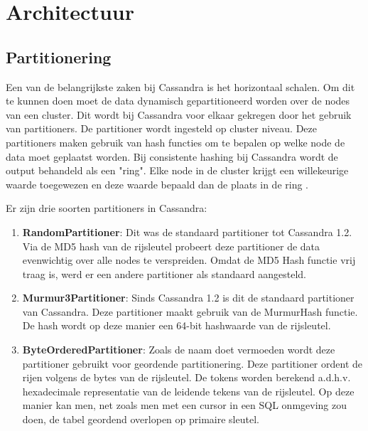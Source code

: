 \chapter{Architectuur}
\label{ch:cassandra_architectuur}

\section{Partitionering}
Een van de belangrijkste zaken bij Cassandra is het horizontaal schalen.
Om dit te kunnen doen moet de data dynamisch gepartitioneerd worden over de nodes van een cluster.
Dit wordt bij Cassandra voor elkaar gekregen door het gebruik van partitioners.
De partitioner wordt ingesteld op cluster niveau.
Deze partitioners maken gebruik van hash functies om te bepalen op welke node de data moet geplaatst worden.
Bij consistente hashing bij Cassandra wordt de output behandeld als een "ring".
Elke node in de cluster krijgt een willekeurige waarde toegewezen en deze waarde bepaald dan de plaats in de ring \citep{lakshman2010cassandra}.


Er zijn drie soorten partitioners in Cassandra:

\begin{enumerate}
	\item \textbf{RandomPartitioner}:
	Dit was de standaard partitioner tot Cassandra 1.2.
	Via de MD5 hash van de rijsleutel probeert deze partitioner de data evenwichtig over alle nodes te verspreiden.
	Omdat de MD5 Hash functie vrij traag is, werd er een andere partitioner als standaard aangesteld.
	
	\item \textbf{Murmur3Partitioner}:
	Sinds Cassandra 1.2 is dit de standaard partitioner van Cassandra.
	Deze partitioner maakt gebruik van de MurmurHash functie.
	De hash wordt op deze manier een 64-bit hashwaarde van de rijsleutel.
	
	\item \textbf{ByteOrderedPartitioner}:
	Zoals de naam doet vermoeden wordt deze partitioner gebruikt voor geordende partitionering.
	Deze partitioner ordent de rijen volgens de bytes van de rijsleutel.
	De tokens worden berekend a.d.h.v. hexadecimale representatie van de leidende tekens van de rijsleutel.
	Op deze manier kan men, net zoals men met een cursor in een SQL onmgeving zou doen, de tabel geordend overlopen op primaire sleutel.
	
\end{enumerate}

